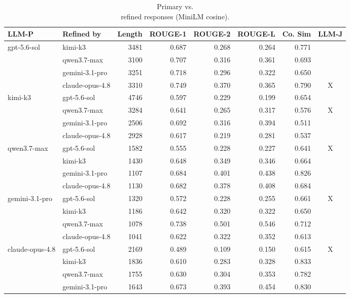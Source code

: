 \begin{table}[t]
\centering
\small
\begin{tabular}{llrrrrrc}
\toprule
LLM-P & Refined by & Length & ROUGE-1 & ROUGE-2 & ROUGE-L & Co. Sim & LLM-J \\
\midrule
\multirow{4}{*}{gpt-5.6-sol} & kimi-k3 & 3481 & 0.687 & 0.268 & 0.264 & 0.771 &  \\
 & qwen3.7-max & 3100 & 0.707 & 0.316 & 0.361 & 0.693 &  \\
 & gemini-3.1-pro & 3251 & 0.718 & 0.296 & 0.322 & 0.650 &  \\
 & claude-opus-4.8 & 3310 & 0.749 & 0.370 & 0.365 & 0.790 & X \\
\multirow{4}{*}{kimi-k3} & gpt-5.6-sol & 4746 & 0.597 & 0.229 & 0.199 & 0.654 &  \\
 & qwen3.7-max & 3284 & 0.641 & 0.265 & 0.317 & 0.576 & X \\
 & gemini-3.1-pro & 2506 & 0.692 & 0.316 & 0.394 & 0.511 &  \\
 & claude-opus-4.8 & 2928 & 0.617 & 0.219 & 0.281 & 0.537 &  \\
\multirow{4}{*}{qwen3.7-max} & gpt-5.6-sol & 1582 & 0.555 & 0.228 & 0.227 & 0.641 & X \\
 & kimi-k3 & 1430 & 0.648 & 0.349 & 0.346 & 0.664 &  \\
 & gemini-3.1-pro & 1107 & 0.684 & 0.401 & 0.438 & 0.826 &  \\
 & claude-opus-4.8 & 1130 & 0.682 & 0.378 & 0.408 & 0.684 &  \\
\multirow{4}{*}{gemini-3.1-pro} & gpt-5.6-sol & 1320 & 0.572 & 0.228 & 0.255 & 0.661 & X \\
 & kimi-k3 & 1186 & 0.642 & 0.320 & 0.322 & 0.650 &  \\
 & qwen3.7-max & 1078 & 0.738 & 0.501 & 0.546 & 0.712 &  \\
 & claude-opus-4.8 & 1041 & 0.622 & 0.322 & 0.352 & 0.613 &  \\
\multirow{4}{*}{claude-opus-4.8} & gpt-5.6-sol & 2169 & 0.489 & 0.109 & 0.150 & 0.615 & X \\
 & kimi-k3 & 1836 & 0.610 & 0.283 & 0.328 & 0.833 &  \\
 & qwen3.7-max & 1755 & 0.630 & 0.304 & 0.353 & 0.782 &  \\
 & gemini-3.1-pro & 1643 & 0.673 & 0.393 & 0.454 & 0.830 &  \\
\bottomrule
\end{tabular}
\caption{Primary vs.\\ refined responses (MiniLM cosine).}
\label{tab:primary-refined}
\end{table}